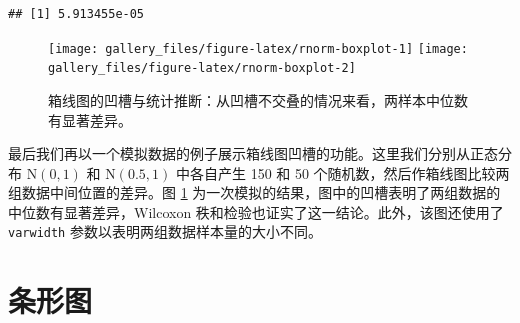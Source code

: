 \documentclass[
  b5paper,
  UTF8,twoside]{book}
\begin{document}
\begin{verbatim}
## [1] 5.913455e-05
\end{verbatim}

\begin{figure}

{\centering \texttt{[image: gallery\_files/figure-latex/rnorm-boxplot-1]} \texttt{[image: gallery\_files/figure-latex/rnorm-boxplot-2]} 

}

\caption[箱线图的凹槽与统计推断]{箱线图的凹槽与统计推断：从凹槽不交叠的情况来看，两样本中位数有显著差异。}\label{fig:rnorm-boxplot}
\end{figure}

最后我们再以一个模拟数据的例子展示箱线图凹槽的功能。这里我们分别从正态分布 \(\mathrm{N}(0,1)\) 和 \(\mathrm{N}(0.5,1)\) 中各自产生 150 和 50 个随机数，然后作箱线图比较两组数据中间位置的差异。图 \ref{fig:rnorm-boxplot} 为一次模拟的结果，图中的凹槽表明了两组数据的中位数有显著差异，Wilcoxon 秩和检验也证实了这一结论。此外，该图还使用了 \texttt{varwidth} 参数以表明两组数据样本量的大小不同。

\hypertarget{sec:barplot}{%
\section{条形图}\label{sec:barplot}}
\end{document}
